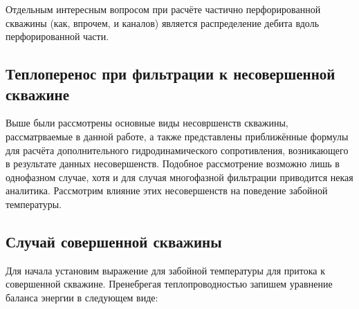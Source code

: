 	Отдельным интересным вопросом при расчёте частично перфорированной скважины (как, впрочем, и каналов) является распределение дебита вдоль перфорированной части.


\subsection{Теплоперенос при фильтрации к несовершенной скважине}
	Выше были рассмотрены основные виды несовршенств скважины, рассматрваемые в данной работе, а также представлены приближённые формулы для расчёта дополнительного гидродинамического сопротивления, возникающего в результате данных несовершенств.
	Подобное рассмотрение возможно лишь в однофазном случае, хотя и для случая многофазной фильтрации приводится некая аналитика.
	Рассмотрим влияние этих несовершенств на поведение забойной температуры.

\subsection{Случай совершенной скважины}
	Для начала установим выражение для забойной температуры для притока к совершенной скважине.
	Пренебрегая теплопроводностью запишем уравнение баланса энергии в следующем виде:
